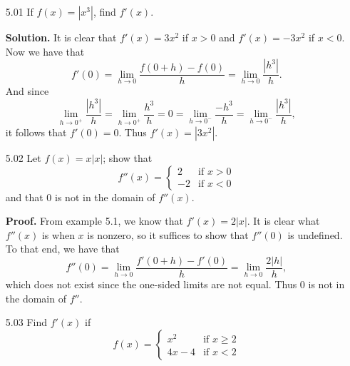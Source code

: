 \begin{enumerate}
   \item[5.01] If $f(x) = |x^3|$, find $f'(x)$.

      \textbf{Solution.} It is clear that $f'(x) = 3x^2$ if $x > 0$ and
      $f'(x) = -3x^2$ if $x < 0$. Now we have that
      $$f'(0) = \lim_{h \to 0}\frac{f(0 + h) - f(0)}{h} =
        \lim_{h \to 0}\frac{|h^3|}{h}.
      $$
      And since
      $$\lim_{h \to 0^+}\frac{|h^3|}{h} = \lim_{h \to 0^+}\frac{h^3}{h} = 0 =
        \lim_{h \to 0^-}\frac{-h^3}{h} = \lim_{h \to 0^-}\frac{|h^3|}{h},$$
      it follows that $f'(0) = 0$. Thus $f'(x) = |3x^2|$.
   \item[5.02] Let $f(x) = x|x|$; show that
               \begin{equation*}
                  f''(x) = \left\{\begin{array}{rl}
                     2 & \text{if } x > 0 \\
                     -2 & \text{if } x < 0
                  \end{array} \right. 
               \end{equation*}
               and that 0 is not in the domain of $f''(x)$.
               
      \textbf{Proof.} From example 5.1, we know that  $f'(x) = 2|x|$. It is
      clear what $f''(x)$ is when $x$ is nonzero, so it suffices to show that
      $f''(0)$ is undefined. To that end, we have that
      $$f''(0) = \lim_{h \to 0}\frac{f'(0 + h) - f'(0)}{h} = 
        \lim_{h \to 0}\frac{2|h|}{h},$$
      which does not exist since the one-sided limits are not equal. Thus 0 is
      not in the domain of $f''$.
   \item[5.03] Find $f'(x)$ if
               \begin{equation*}
                  f(x) = \left\{\begin{array}{rl}
                     x^2 & \text{if } x \ge 2 \\
                     4x - 4 & \text{if } x < 2
                  \end{array} \right. 
               \end{equation*}
               

\end{enumerate}

